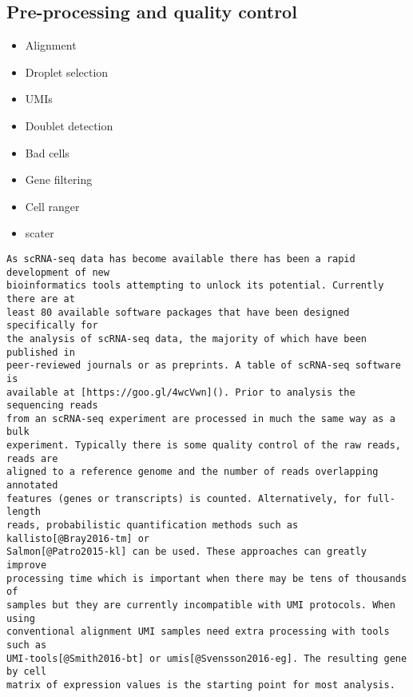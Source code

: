 \documentclass[11pt,a4paper,titlepage,twoside,openright]{style/unimelbthesis}
\theoremstyle{definition}
\theoremstyle{definition}
\theoremstyle{definition}
\theoremstyle{remark}
\begin{document}
\begin{mainmatter}
\hypertarget{pre-processing-and-quality-control}{%
\subsection{Pre-processing and quality control}\label{pre-processing-and-quality-control}}

\begin{itemize}
\tightlist
\item
  Alignment
\item
  Droplet selection
\item
  UMIs
\item
  Doublet detection
\item
  Bad cells
\item
  Gene filtering
\item
  Cell ranger
\item
  scater
\end{itemize}

\begin{verbatim}
As scRNA-seq data has become available there has been a rapid development of new
bioinformatics tools attempting to unlock its potential. Currently there are at
least 80 available software packages that have been designed specifically for
the analysis of scRNA-seq data, the majority of which have been published in
peer-reviewed journals or as preprints. A table of scRNA-seq software is
available at [https://goo.gl/4wcVwn](). Prior to analysis the sequencing reads
from an scRNA-seq experiment are processed in much the same way as a bulk
experiment. Typically there is some quality control of the raw reads, reads are
aligned to a reference genome and the number of reads overlapping annotated
features (genes or transcripts) is counted. Alternatively, for full-length
reads, probabilistic quantification methods such as kallisto[@Bray2016-tm] or
Salmon[@Patro2015-kl] can be used. These approaches can greatly  improve
processing time which is important when there may be tens of thousands of
samples but they are currently incompatible with UMI protocols. When using
conventional alignment UMI samples need extra processing with tools such as
UMI-tools[@Smith2016-bt] or umis[@Svensson2016-eg]. The resulting gene by cell
matrix of expression values is the starting point for most analysis.


\end{verbatim}
\end{mainmatter}
\end{document}
